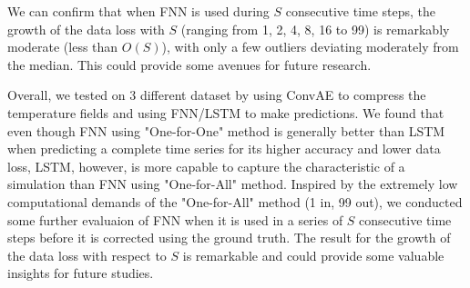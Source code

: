 We can confirm that when FNN is used during $S$ consecutive time steps, the growth of the data loss with $S$ (ranging from 1, 2, 4, 8, 16 to 99) is remarkably moderate (less than $O(S)$), with only a few outliers deviating moderately from the median. This could provide some avenues for future research.

Overall, we tested on 3 different dataset by using ConvAE to compress the temperature fields and using FNN/LSTM to make predictions. We found that even though FNN using "One-for-One" method is generally better than LSTM when predicting a complete time series for its higher accuracy and lower data loss, LSTM, however, is more capable to capture the characteristic of a simulation than FNN using "One-for-All" method. Inspired by the extremely low computational demands of the "One-for-All" method (1 in, 99 out), we conducted some further evaluaion of FNN when it is used in a series of $S$ consecutive time steps before it is corrected using the ground truth. The result for the growth of the data loss with respect to $S$ is remarkable and could provide some valuable insights for future studies.




